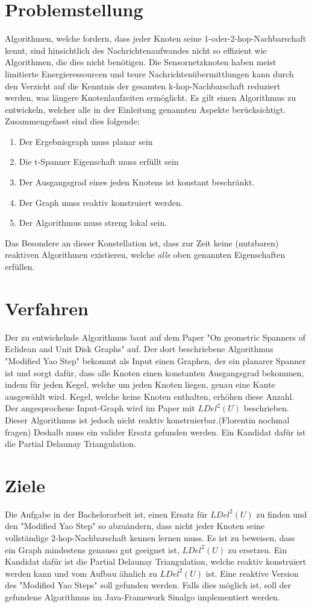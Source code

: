 \documentclass[a4paper,DIV10,10pt,headsepline,smallheadings]{scrreprt}
\begin{document}
\section{Problemstellung}
Algorithmen, welche fordern, dass jeder Knoten seine 1-oder-2-hop-Nachbarschaft kennt, sind hinsichtlich des Nachrichtenaufwandes nicht so effizient wie Algorithmen, die dies nicht benötigen.
Die Sensornetzknoten haben meist limitierte Energieressourcen und teure Nachrichtenübermittlungen kann durch den Verzicht auf die Kenntnis der gesamten k-hop-Nachbarschaft reduziert werden, was längere Knotenlaufzeiten ermöglicht.
Es gilt einen Algorithmus zu entwickeln, welcher alle in der Einleitung genannten Aspekte berücksichtigt.
Zusammengefasst sind dies folgende:
\begin{enumerate}
\item Der Ergebnisgraph muss planar sein
\item Die t-Spanner Eigenschaft muss erfüllt sein
\item Der Ausgangsgrad eines jeden Knotens ist konstant beschränkt.
\item Der Graph muss reaktiv konstruiert werden.
\item Der Algorithmus muss streng lokal sein.
\end{enumerate}
Das Besondere an dieser Konstellation ist, dass zur Zeit keine (nutzbaren) reaktiven Algorithmen existieren, welche \emph{alle} oben genannten Eigenschaften erfüllen.

\section{Verfahren}
Der zu entwickelnde Algorithmus baut auf dem Paper "On geometric Spanners of Eclidean and Unit Disk Graphs" auf.
Der dort beschriebene Algorithmus "Modified Yao Step" bekommt als Input einen Graphen, der ein planarer Spanner ist und sorgt dafür, dass alle Knoten einen konstanten Ausgangsgrad bekommen, indem für jeden Kegel, welche um jeden Knoten liegen, genau eine Kante ausgewählt wird.
Kegel, welche keine Knoten enthalten, erhöhen diese Anzahl.
Der angesprochene Input-Graph wird im Paper mit $LDel^2(U) $ beschrieben.
Dieser Algorithmus ist jedoch nicht reaktiv konstruierbar.(Florentin nochmal fragen)
Deshalb muss ein valider Ersatz gefunden werden.
Ein Kandidat dafür ist die Partial Delaunay Triangulation.


\section{Ziele}
Die Aufgabe in der Bachelorarbeit ist, einen Ersatz für $LDel^2(U) $ zu finden und den "Modified Yao Step" so abzuändern, dass nicht jeder Knoten seine vollständige 2-hop-Nachbarschaft kennen lernen muss.
Es ist zu beweisen, dass ein Graph mindestens genauso gut geeignet ist, $LDel^2(U) $ zu ersetzen.
Ein Kandidat dafür ist die Partial Delaunay Triangulation, welche reaktiv konstruiert werden kann und vom Aufbau ähnlich zu $LDel^2(U) $ ist.
Eine reaktive Version des "Modified Yao Steps" soll gefunden werden.
Falls dies möglich ist, soll der gefundene Algorithmus im Java-Framework Sinalgo implementiert werden.
\end{document}
